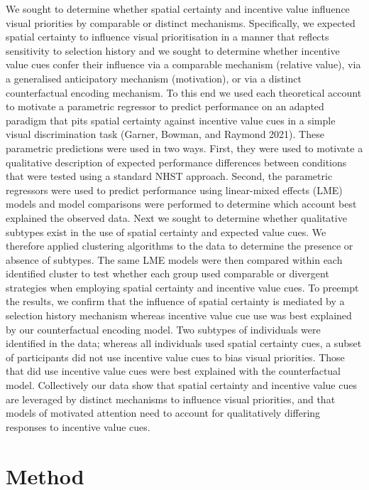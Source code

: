 \documentclass[11pt,halfline,a4paper,]{ouparticle}
\begin{document}
We sought to determine whether spatial certainty and incentive value influence visual priorities by comparable or distinct mechanisms. Specifically, we expected spatial certainty to influence visual prioritisation in a manner that reflects sensitivity to selection history and we sought to determine whether incentive value cues confer their influence via a comparable mechanism (relative value), via a generalised anticipatory mechanism (motivation), or via a distinct counterfactual encoding mechanism. To this end we used each theoretical account to motivate a parametric regressor to predict performance on an adapted paradigm that pits spatial certainty against incentive value cues in a simple visual discrimination task (Garner, Bowman, and Raymond 2021). These parametric predictions were used in two ways. First, they were used to motivate a qualitative description of expected performance differences between conditions that were tested using a standard NHST approach. Second, the parametric regressors were used to predict performance using linear-mixed effects (LME) models and model comparisons were performed to determine which account best explained the observed data. Next we sought to determine whether qualitative subtypes exist in the use of spatial certainty and expected value cues. We therefore applied clustering algorithms to the data to determine the presence or absence of subtypes. The same LME models were then compared within each identified cluster to test whether each group used comparable or divergent strategies when employing spatial certainty and incentive value cues. To preempt the results, we confirm that the influence of spatial certainty is mediated by a selection history mechanism whereas incentive value cue use was best explained by our counterfactual encoding model. Two subtypes of individuals were identified in the data; whereas all individuals used spatial certainty cues, a subset of participants did not use incentive value cues to bias visual priorities. Those that did use incentive value cues were best explained with the counterfactual model. Collectively our data show that spatial certainty and incentive value cues are leveraged by distinct mechanisms to influence visual priorities, and that models of motivated attention need to account for qualitatively differing responses to incentive value cues.

\hypertarget{method}{%
\section{Method}\label{method}}
\end{document}
